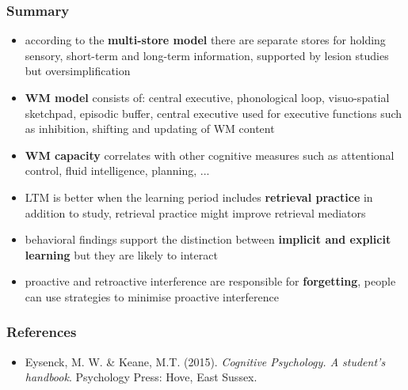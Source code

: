 \documentclass[]{beamer}
\begin{document}
\begin{frame}
 \frametitle{Summary}
\begin{itemize}[<+->]
\setlength{\itemsep}{2pt}
 \item according to the \textbf{multi-store model} there are separate stores for holding sensory, short-term and long-term information, supported by lesion studies but oversimplification

 \item \textbf{WM model} consists of: central executive, phonological loop, visuo-spatial sketchpad, episodic buffer, central executive used for executive functions such as inhibition, shifting and updating of WM content

 \item \textbf{WM capacity} correlates with other cognitive measures such as attentional control, fluid intelligence, planning, ...

 \item LTM is better when the learning period includes \textbf{retrieval practice} in addition to study, retrieval practice might improve retrieval mediators

 \item behavioral findings support the distinction between \textbf{implicit and explicit learning} but they are likely to interact
 
 \item proactive and retroactive interference are responsible for \textbf{forgetting}, people can use strategies to minimise proactive interference 
\end{itemize}
\end{frame}



\begin{frame}
 \frametitle{References}
\begin{small}
\begin{itemize}
 \item  Eysenck, M. W. \& Keane, M.T. (2015). \textit{Cognitive Psychology. A student's handbook}. Psychology Press: Hove, East Sussex. 
\end{itemize}
\end{small}
\end{frame}
\end{document}
